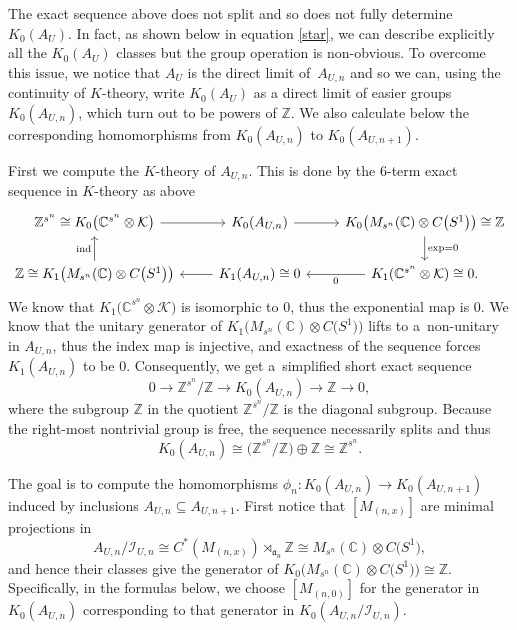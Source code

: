 \documentclass[pdftex]{sigma}
\newcommand{\C}{{\mathbb C}}
\newcommand{\Z}{{\mathbb Z}}
\newcommand{\kcal}{{\mathcal K}}
\newcommand{\fancyI}{\mathcal{I}}
\numberwithin{equation}{section}
\begin{document}
The exact sequence above does not split and so does not fully determine $K_0(A_U)$. In fact, as shown below in equation \eqref{star}, we can describe explicitly all the $K_0(A_U)$ classes but the group operation is non-obvious. To overcome this issue, we notice that $A_U$ is the direct limit of~$A_{U,n}$ and so we can, using the continuity of $K$-theory, write $K_0(A_U)$ as a direct limit of easier groups $K_0(A_{U,n})$, which turn out to be powers of $\Z$. We also calculate below the corresponding homomorphisms from $K_0(A_{U,n})$ to $K_0(A_{U,n+1})$.

First we compute the $K$-theory of $A_{U,n}$. This is done by the 6-term exact sequence in $K$-theory as above
\begin{equation*}
\begin{tikzcd}
\Z^{s^n} \cong K_0\bigl(\C^{s^n} \otimes \kcal\bigr) \arrow[r] & K_0(A_{U,n}) \arrow[r] & K_0\bigl(M_{s^n}(\C)\otimes C\bigl(S^1\bigr)\bigr) \cong \Z \arrow{d}{\textup{exp}=0} \\
 \Z \cong K_1\bigl(M_{s^n}(\C)\otimes C\bigl(S^1\bigr)\bigr) \arrow{u}{\textup{ind}} & K_1(A_{U,n})\cong0 \arrow[l] & K_1(\C^{s^n} \otimes \kcal)\cong0 \arrow[l,"0"].
\end{tikzcd}
\end{equation*}
We know that $K_1\bigl(\C^{s^n}\otimes \kcal\bigr)$ is isomorphic to 0, thus the exponential map is 0. We know that the unitary generator of $K_1\bigl(M_{s^n}(\C) \otimes C\bigl(S^1\bigr)\bigr)$ lifts to a~non-unitary in $A_{U,n}$, thus the index map is injective, and exactness of the sequence forces $K_1(A_{U,n})$ to be 0.
Consequently, we get a~simplified short exact sequence
\begin{equation*}
0\to \Z^{s^n}/\Z \to K_0(A_{U,n}) \to \Z \to 0,
\end{equation*}
where the subgroup $\Z$ in the quotient $\Z^{s^n}/\Z$ is the diagonal subgroup. Because the right-most nontrivial group is free, the sequence necessarily splits and thus
\begin{equation*}
K_0(A_{U,n})\cong \bigl(\Z^{s^n}/\Z\bigr) \oplus \Z \cong \Z^{s^n}.
\end{equation*}

The goal is to compute the homomorphisms $\phi_n \colon K_0(A_{U,n}) \to K_0(A_{U,n+1})$ induced by inclusions $A_{U,n}\subseteq A_{U,n+1}$. First notice that $[M_{(n,x)}]$ are minimal projections in
\begin{equation*}
A_{U,n}/\fancyI_{U,n}\cong C^*(M_{(n,x)})\rtimes_{\mathfrak{a}_u} \Z\cong M_{s^n}(\C)\otimes C\bigl(S^1\bigr),
\end{equation*}
and hence their classes give the generator of $K_0\bigl(M_{s^n}(\C)\otimes C\bigl(S^1\bigr)\bigr) \cong \Z$. Specifically, in the formulas below, we choose $[M_{(n,0)}]$ for the generator in $K_0(A_{U,n})$ corresponding to that generator in $K_0(A_{U,n}/\fancyI_{U,n})$.
\end{document}
